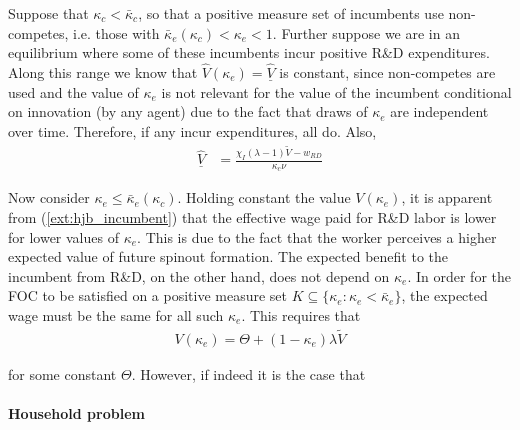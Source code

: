 Suppose that $\kappa_c < \bar{\kappa}_c$, so that a positive measure set of incumbents use non-competes, i.e. those with $\bar{\kappa}_e(\kappa_c) < \kappa_e < 1$. Further suppose we are in an equilibrium where some of these incumbents incur positive R\&D expenditures. Along this range we know that $\hat{V}(\kappa_e) = \hat{\underline{V}}$ is constant, since non-competes are used and the value of $\kappa_e$ is not relevant for the value of the incumbent conditional on innovation (by any agent) due to the fact that draws of $\kappa_e$ are independent over time. Therefore, if any incur expenditures, all do. Also, 
\begin{align}
	\hat{\underline{V}} &= \frac{\chi_I(\lambda-1) \tilde{V} - w_{RD}}{\kappa_c \nu }	
\end{align}

Now consider $\kappa_e \le \bar{\kappa}_e(\kappa_c)$. Holding constant the value $V(\kappa_e)$, it is apparent from (\ref{ext:hjb_incumbent}) that the effective wage paid for R\&D labor is lower for lower values of $\kappa_e$. This is due to the fact that the worker perceives a higher expected value of future spinout formation. The expected benefit to the incumbent from R\&D, on the other hand, does not depend on $\kappa_e$. In order for the FOC to be satisfied on a positive measure set $K \subseteq \{ \kappa_e: \kappa_e < \bar{\kappa}_e \}$, the expected wage must be the same for all such $\kappa_e$. This requires that
\begin{align}
	V(\kappa_e) = \Theta + (1-\kappa_e)\lambda \tilde{V} 
\end{align}

for some constant $\Theta$. However, if indeed it is the case that 

\paragraph{Household problem}

